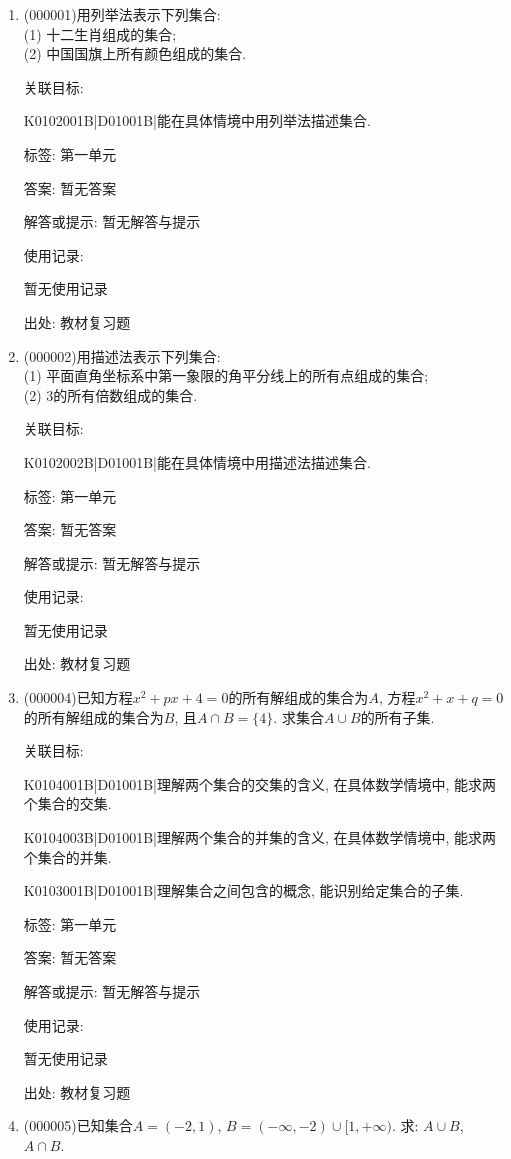 \documentclass[10pt,a4paper]{article}
\begin{document}
\begin{enumerate}[1.]

\item { (000001)}用列举法表示下列集合:\\
(1) 十二生肖组成的集合;\\
(2) 中国国旗上所有颜色组成的集合.


关联目标:

K0102001B|D01001B|能在具体情境中用列举法描述集合.



标签: 第一单元

答案: 暂无答案

解答或提示: 暂无解答与提示

使用记录:

暂无使用记录


出处: 教材复习题
\item { (000002)}用描述法表示下列集合:\\
(1) 平面直角坐标系中第一象限的角平分线上的所有点组成的集合;\\
(2) $3$的所有倍数组成的集合.


关联目标:

K0102002B|D01001B|能在具体情境中用描述法描述集合.



标签: 第一单元

答案: 暂无答案

解答或提示: 暂无解答与提示

使用记录:

暂无使用记录


出处: 教材复习题
\item { (000004)}已知方程$x^2+px+4=0$的所有解组成的集合为$A$, 方程$x^2+x+q=0$的所有解组成的集合为$B$, 且$A\cap B=\{4\}$. 求集合$A\cup B$的所有子集.


关联目标:

K0104001B|D01001B|理解两个集合的交集的含义, 在具体数学情境中, 能求两个集合的交集.

K0104003B|D01001B|理解两个集合的并集的含义, 在具体数学情境中, 能求两个集合的并集.

K0103001B|D01001B|理解集合之间包含的概念, 能识别给定集合的子集.



标签: 第一单元

答案: 暂无答案

解答或提示: 暂无解答与提示

使用记录:

暂无使用记录


出处: 教材复习题
\item { (000005)}已知集合$A=(-2, 1)$, $B=(-\infty, -2)\cup [1, +\infty)$. 求: $A\cup B$, $A\cap B$.



\end{enumerate}
\end{document}
